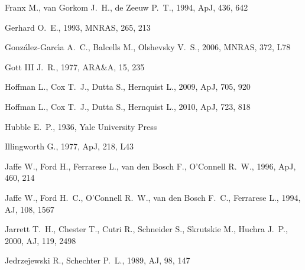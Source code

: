 \documentclass[usenatbib,usegraphicx]{mn2e}
\def\aj{AJ}             %
\def\araa{ARA\&A}       %
\def\apj{ApJ}           %
\def\apjl{ApJ}          %
\def\mnras{MNRAS}       %
\begin{document}
\begin{thebibliography}{}
{Franx} M.,  {van Gorkom} J.~H.,    {de Zeeuw} P.~T.,  1994, \apj, 436, 642

{Gerhard} O.~E.,  1993, \mnras, 265, 213

{Gonz{\'a}lez-Garc{\'{\i}}a} A.~C.,  {Balcells} M.,    {Olshevsky} V.~S.,
  2006, \mnras, 372, L78

{Gott} III J.~R.,  1977, \araa, 15, 235

{Hoffman} L.,  {Cox} T.~J.,  {Dutta} S.,    {Hernquist} L.,  2009, \apj, 705,
  920

{Hoffman} L.,  {Cox} T.~J.,  {Dutta} S.,    {Hernquist} L.,  2010, \apj, 723,
  818

{Hubble} E.~P.,  1936, Yale University Press

{Illingworth} G.,  1977, \apjl, 218, L43

{Jaffe} W.,  {Ford} H.,  {Ferrarese} L.,  {van den Bosch} F.,    {O'Connell}
  R.~W.,  1996, \apj, 460, 214

{Jaffe} W.,  {Ford} H.~C.,  {O'Connell} R.~W.,  {van den Bosch} F.~C.,
  {Ferrarese} L.,  1994, \aj, 108, 1567

{Jarrett} T.~H.,  {Chester} T.,  {Cutri} R.,  {Schneider} S.,  {Skrutskie} M.,
    {Huchra} J.~P.,  2000, \aj, 119, 2498

{Jedrzejewski} R.,  {Schechter} P.~L.,  1989, \aj, 98, 147


\end{thebibliography}
\end{document}
